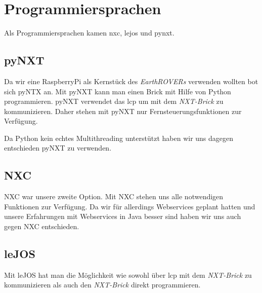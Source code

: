 \chapter{Programmiersprachen}
Als Programmiersprachen kamen \gls{nxc}, \gls{lejos} und \gls{pynxt}. 

\section{pyNXT}
Da wir eine RaspberryPi als Kernstück des \textit{EarthROVERs} verwenden wollten bot sich pyNTX an. Mit pyNXT kann man einen Brick mit Hilfe von Python programmieren. pyNXT verwendet das \gls{lcp} um mit dem \textit{NXT-Brick} zu kommunizieren. Daher stehen mit pyNXT nur Fernsteuerungsfunktionen zur Verfügung.


Da Python kein echtes Multithreading unterstützt haben wir uns dagegen entschieden pyNXT zu verwenden.

\section{NXC}
NXC war unsere zweite Option. Mit NXC stehen uns alle notwendigen Funktionen zur Verfügung. Da wir für allerdings Webservices geplant hatten und unsere Erfahrungen mit Webservices in Java besser sind haben wir uns auch gegen NXC entschieden.

\section{leJOS}
Mit leJOS hat man die Möglichkeit wie sowohl über \gls{lcp} mit dem \textit{NXT-Brick} zu kommunizieren als auch den \textit{NXT-Brick} direkt programmieren. 
